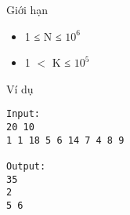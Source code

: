 Giới hạn
\begin{itemize}
	\item     1 ≤ N ≤ $10^{6}$
	\item     1 $<$ K ≤ $10^{5}$
\end{itemize}
Ví dụ
\begin{verbatim}
Input:
20 10
1 1 18 5 6 14 7 4 8 9

Output:
35
2
5 6
\end{verbatim}